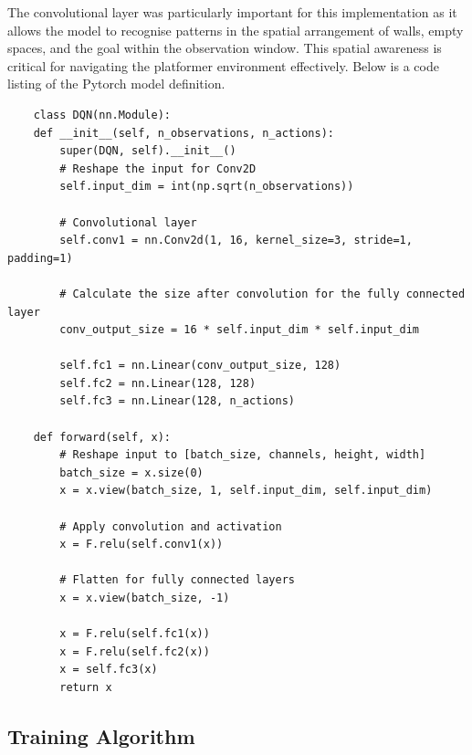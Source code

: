 The convolutional layer was particularly important for this implementation as it allows the model to recognise patterns in the spatial arrangement of walls, empty spaces, and the goal within the observation window. 
This spatial awareness is critical for navigating the platformer environment effectively. Below is a code listing of the Pytorch model definition.
\singlespaced
\begin{verbatim}
    class DQN(nn.Module):
    def __init__(self, n_observations, n_actions):
        super(DQN, self).__init__()
        # Reshape the input for Conv2D
        self.input_dim = int(np.sqrt(n_observations))
        
        # Convolutional layer
        self.conv1 = nn.Conv2d(1, 16, kernel_size=3, stride=1, padding=1)
        
        # Calculate the size after convolution for the fully connected layer
        conv_output_size = 16 * self.input_dim * self.input_dim
        
        self.fc1 = nn.Linear(conv_output_size, 128)
        self.fc2 = nn.Linear(128, 128)
        self.fc3 = nn.Linear(128, n_actions)
        
    def forward(self, x):
        # Reshape input to [batch_size, channels, height, width]
        batch_size = x.size(0)
        x = x.view(batch_size, 1, self.input_dim, self.input_dim)
        
        # Apply convolution and activation
        x = F.relu(self.conv1(x))
        
        # Flatten for fully connected layers
        x = x.view(batch_size, -1)
        
        x = F.relu(self.fc1(x))
        x = F.relu(self.fc2(x))
        x = self.fc3(x)
        return x
\end{verbatim}
\doublespaced

\subsection{Training Algorithm}

